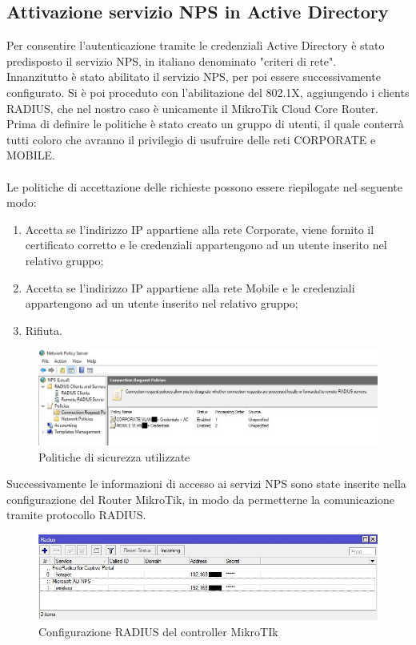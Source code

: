 \documentclass[Realizzazione.tex]{subfiles}
\begin{document}
\subsection{Attivazione servizio NPS in Active Directory} 
Per consentire l'autenticazione tramite le credenziali Active Directory è stato predisposto il servizio NPS, in italiano denominato "criteri di rete". \\
Innanzitutto è stato abilitato il servizio NPS, per poi essere successivamente configurato. Si è poi proceduto con l'abilitazione del 802.1X, aggiungendo i clients RADIUS, che nel nostro caso è unicamente il MikroTik Cloud Core Router.\\
Prima di definire le politiche è stato creato un gruppo di utenti, il quale conterrà tutti coloro che avranno il privilegio di usufruire delle reti CORPORATE e MOBILE. \\\\
Le politiche di accettazione delle richieste possono essere riepilogate nel seguente modo:
\begin{enumerate}
\item Accetta se l'indirizzo IP appartiene alla rete Corporate, viene fornito il certificato corretto e le credenziali appartengono ad un utente inserito nel relativo gruppo;
\item Accetta se l'indirizzo IP appartiene alla rete Mobile e le credenziali appartengono ad un utente inserito nel relativo gruppo;
\item Rifiuta.
\end{enumerate}

\begin{figure}[H]
	\centering
	\includegraphics[width=1\linewidth]{"images/nps_conf"}
	\caption{Politiche di sicurezza utilizzate}
	\label{fig:Politiche di sicurezza utilizzate}
\end{figure}


Successivamente le informazioni di accesso ai servizi NPS sono state inserite nella configurazione del Router MikroTik, in modo da permetterne la comunicazione tramite protocollo RADIUS.

\begin{figure}[H]
	\centering
	\includegraphics[width=1\linewidth]{"images/nps_miktorik"}
	\caption{Configurazione RADIUS del controller MikroTIk}
	\label{fig:Configurazione RADIUS del controller MikroTIk}
\end{figure}
\end{document}

